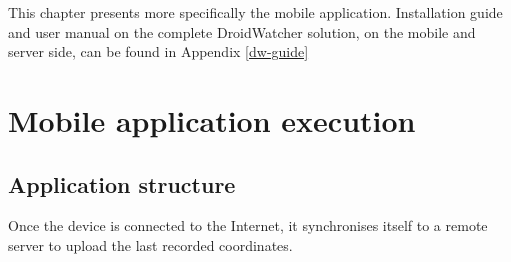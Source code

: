 This chapter presents more specifically the mobile application.
Installation guide and user manual on the complete DroidWatcher solution, on the mobile and server side, can be found in Appendix \ref{dw-guide}




\section{Mobile application execution}

\subsection{Application structure}
\label{sec:dw-app-structure}

Once the device is connected to the Internet, it synchronises itself to a remote server to upload the last recorded coordinates.\\

